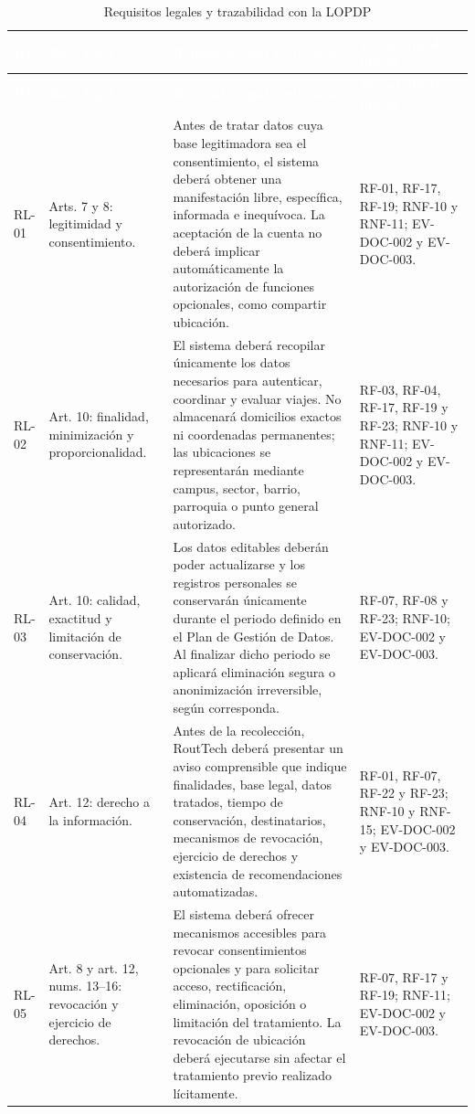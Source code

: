 \documentclass[12pt,a4paper]{article}
\begin{document}
\begin{longtable}{C{1.35cm} L{2.25cm} L{5.75cm} L{4.25cm}}
\caption{Requisitos legales y trazabilidad con la LOPDP}\label{tab:requisitos-legales}\\
\textcolor{white}{\textbf{ID}} &
\textcolor{white}{\textbf{Base legal}} &
\textcolor{white}{\textbf{Requisito legal verificable}} &
\textcolor{white}{\textbf{Trazabilidad inicial}}\\
\endfirsthead
{}
\textcolor{white}{\textbf{ID}} &
\textcolor{white}{\textbf{Base legal}} &
\textcolor{white}{\textbf{Requisito legal verificable}} &
\textcolor{white}{\textbf{Trazabilidad inicial}}\\
\endhead
RL-01 & Arts. 7 y 8: legitimidad y consentimiento. & Antes de tratar datos cuya base legitimadora sea el consentimiento, el sistema deberá obtener una manifestación libre, específica, informada e inequívoca. La aceptación de la cuenta no deberá implicar automáticamente la autorización de funciones opcionales, como compartir ubicación. & RF-01, RF-17, RF-19; RNF-10 y RNF-11; EV-DOC-002 y EV-DOC-003.\\
RL-02 & Art. 10: finalidad, minimización y proporcionalidad. & El sistema deberá recopilar únicamente los datos necesarios para autenticar, coordinar y evaluar viajes. No almacenará domicilios exactos ni coordenadas permanentes; las ubicaciones se representarán mediante campus, sector, barrio, parroquia o punto general autorizado. & RF-03, RF-04, RF-17, RF-19 y RF-23; RNF-10 y RNF-11; EV-DOC-002 y EV-DOC-003.\\
RL-03 & Art. 10: calidad, exactitud y limitación de conservación. & Los datos editables deberán poder actualizarse y los registros personales se conservarán únicamente durante el periodo definido en el Plan de Gestión de Datos. Al finalizar dicho periodo se aplicará eliminación segura o anonimización irreversible, según corresponda. & RF-07, RF-08 y RF-23; RNF-10; EV-DOC-002 y EV-DOC-003.\\
RL-04 & Art. 12: derecho a la información. & Antes de la recolección, RoutTech deberá presentar un aviso comprensible que indique finalidades, base legal, datos tratados, tiempo de conservación, destinatarios, mecanismos de revocación, ejercicio de derechos y existencia de recomendaciones automatizadas. & RF-01, RF-07, RF-22 y RF-23; RNF-10 y RNF-15; EV-DOC-002 y EV-DOC-003.\\
RL-05 & Art. 8 y art. 12, nums. 13--16: revocación y ejercicio de derechos. & El sistema deberá ofrecer mecanismos accesibles para revocar consentimientos opcionales y para solicitar acceso, rectificación, eliminación, oposición o limitación del tratamiento. La revocación de ubicación deberá ejecutarse sin afectar el tratamiento previo realizado lícitamente. & RF-07, RF-17 y RF-19; RNF-11; EV-DOC-002 y EV-DOC-003.\\

\end{longtable}
\end{document}
